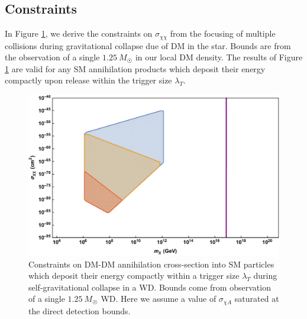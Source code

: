 \documentclass[preprintnumbers,amsmath,amssymb,prd,superscriptaddress]{revtex4}
\begin{document}
\subsection{Constraints}
In Figure \ref{fig:multicapture}, we derive the constraints on $\sigma_{\chi \chi}$ from the focusing of multiple collisions during gravitational collapse due of DM in the star.
Bounds are from the observation of a single $1.25 ~ M_{\astrosun}$ in our local DM density. 
The results of Figure \ref{fig:multicapture} are valid for any SM annihilation products which deposit their energy compactly upon release within the trigger size $\lambda_T$.
\begin{figure}
\includegraphics[scale=.35]{multicollision.pdf}
\caption{Constraints on DM-DM annihilation cross-section into SM particles which deposit their energy compactly within a trigger size $\lambda_T$ during self-gravitational collapse in a WD. Bounds come from observation of a single $1.25~M_{\astrosun}$ WD. Here we assume a value of $\sigma_{\chi A}$ saturated at the direct detection bounds.}
\label{fig:multicapture}
\end{figure}
\end{document}
